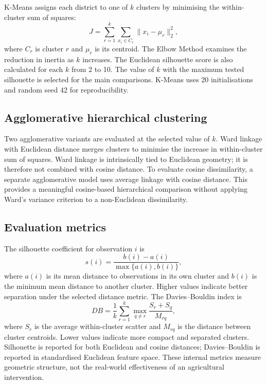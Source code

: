 \documentclass[9pt,a4paper,twocolumn]{extarticle}
\begin{document}
K-Means assigns each district to one of $k$ clusters by minimising the within-cluster sum of squares:
\begin{equation}
 J=\sum_{r=1}^{k}\sum_{x_i\in C_r}\|x_i-\mu_r\|_2^2,
\end{equation}
where $C_r$ is cluster $r$ and $\mu_r$ is its centroid. The Elbow Method examines the reduction in inertia as $k$ increases. The Euclidean silhouette score is also calculated for each $k$ from 2 to 10. The value of $k$ with the maximum tested silhouette is selected for the main comparisons. K-Means uses 20 initialisations and random seed 42 for reproducibility.

\subsection{Agglomerative hierarchical clustering}
Two agglomerative variants are evaluated at the selected value of $k$. Ward linkage with Euclidean distance merges clusters to minimise the increase in within-cluster sum of squares. Ward linkage is intrinsically tied to Euclidean geometry; it is therefore not combined with cosine distance. To evaluate cosine dissimilarity, a separate agglomerative model uses average linkage with cosine distance. This provides a meaningful cosine-based hierarchical comparison without applying Ward's variance criterion to a non-Euclidean dissimilarity.

\subsection{Evaluation metrics}
The silhouette coefficient for observation $i$ is
\begin{equation}
 s(i)=\frac{b(i)-a(i)}{\max\{a(i),b(i)\}},
\end{equation}
where $a(i)$ is its mean distance to observations in its own cluster and $b(i)$ is the minimum mean distance to another cluster. Higher values indicate better separation under the selected distance metric. The Davies--Bouldin index is
\begin{equation}
 DB=\frac{1}{k}\sum_{r=1}^{k}\max_{q\ne r}\frac{S_r+S_q}{M_{rq}},
\end{equation}
where $S_r$ is the average within-cluster scatter and $M_{rq}$ is the distance between cluster centroids. Lower values indicate more compact and separated clusters. Silhouette is reported for both Euclidean and cosine distances; Davies--Bouldin is reported in standardised Euclidean feature space. These internal metrics measure geometric structure, not the real-world effectiveness of an agricultural intervention.
\end{document}

